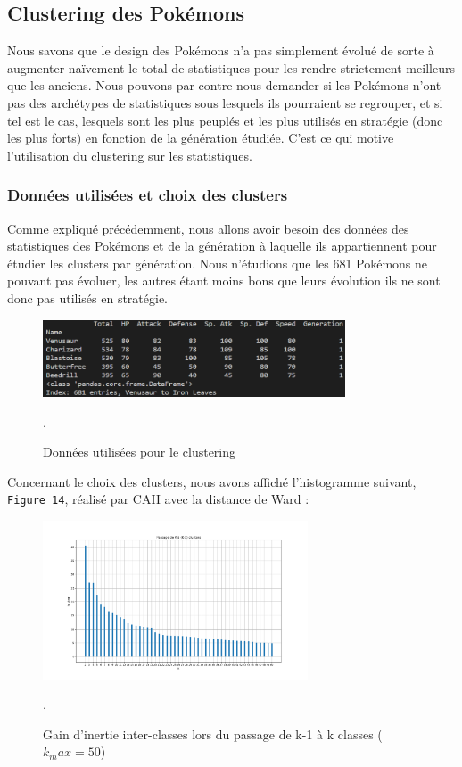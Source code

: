 \documentclass[a4paper,12pt]{article}
\begin{document}
\subsection{Clustering des Pokémons}
Nous savons que le design des Pokémons n'a pas simplement évolué de sorte à
augmenter naïvement le total de statistiques pour les rendre strictement
meilleurs que les anciens. Nous pouvons par contre nous demander si les Pokémons
n'ont pas des archétypes de statistiques sous lesquels ils pourraient se
regrouper, et si tel est le cas, lesquels sont les plus peuplés et les plus
utilisés en stratégie (donc les plus forts) en fonction de la génération
étudiée. C'est ce qui motive l'utilisation du clustering sur les statistiques.

\subsubsection{Données utilisées et choix des clusters}
Comme expliqué précédemment, nous allons avoir besoin des données des
statistiques des Pokémons et de la génération à laquelle ils appartiennent pour
étudier les clusters par génération. Nous n'étudions que les 681 Pokémons ne
pouvant pas évoluer, les autres étant moins bons que leurs évolution ils ne sont
donc pas utilisés en stratégie.

\begin{figure}[h]
    \centering
    \includegraphics[width=0.8\textwidth]{Clustering/stats_gen_infos.png}
    \caption{Données utilisées pour le clustering}.
\end{figure}

Concernant le choix des clusters, nous avons affiché l'histogramme suivant,
\texttt{Figure 14}, réalisé par CAH avec la distance de Ward : 

\begin{figure}[h]
    \centering
    \includegraphics[width=0.7\textwidth]{Clustering/heights_k_clustering_zoomed.png}
    \caption{Gain d'inertie inter-classes lors du passage de k-1 à k classes
    ($k_max = 50$)}.
\end{figure}
\end{document}
